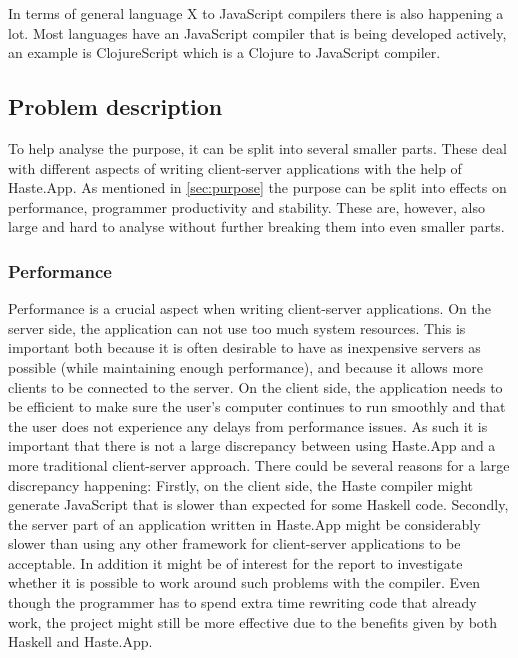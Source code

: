 \documentclass[a4paper]{article}
\begin{document}
In terms of general language X to JavaScript compilers there is also happening a lot. Most languages have an JavaScript compiler that is being developed actively, an example is ClojureScript which is a Clojure to JavaScript compiler.

\subsection{Problem description}
\label{sec:problem}
To help analyse the purpose, it can be split into several smaller parts. These deal with different aspects of writing client-server applications with the help of Haste.App. As mentioned in \cref{sec:purpose} the purpose can be split into effects on performance, programmer productivity and stability. These are, however, also large and hard to analyse without further breaking them into even smaller parts.


\subsubsection{Performance}
Performance is a crucial aspect when writing client-server applications. On the server side, the application can not use too much system resources. This is important both because it is often desirable to have as inexpensive servers as possible (while maintaining enough performance), and because it allows more clients to be connected to the server. On the client side, the application needs to be efficient to make sure the user's computer continues to run smoothly and that the user does not experience any delays from performance issues. As such it is important that there is not a large discrepancy between using Haste.App and a more traditional client-server approach. There could be several reasons for a large discrepancy happening: Firstly, on the client side, the Haste compiler might generate JavaScript that is slower than expected for some Haskell code. Secondly, the server part of an application written in Haste.App might be considerably slower than using any other framework for client-server applications to be acceptable. In addition it might be of interest for the report to investigate whether it is possible to work around such problems with the compiler. Even though the programmer has to spend extra time rewriting code that already work, the project might still be more effective due to the benefits given by both Haskell and Haste.App.
\end{document}
